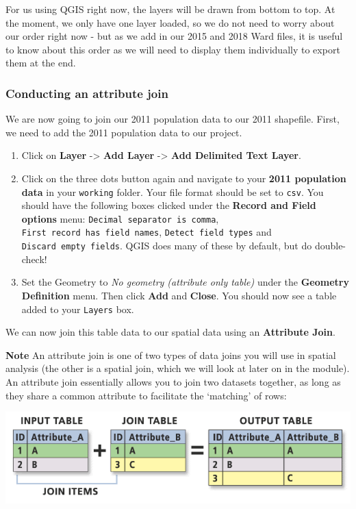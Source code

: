 \documentclass[
]{book}
\begin{document}
For us using QGIS right now, the layers will be drawn from bottom to top. At the moment, we only have one layer loaded, so we do not need to worry about our order right now - but as we add in our 2015 and 2018 Ward files, it is useful to know about this order as we will need to display them individually to export them at the end.

\hypertarget{conducting-an-attribute-join}{%
\subsubsection{Conducting an attribute join}\label{conducting-an-attribute-join}}

We are now going to join our 2011 population data to our 2011 shapefile. First, we need to add the 2011 population data to our project.

\begin{enumerate}
\def\labelenumi{\arabic{enumi}.}
\item
  Click on \textbf{Layer} -\textgreater{} \textbf{Add Layer} -\textgreater{} \textbf{Add Delimited Text Layer}.
\item
  Click on the three dots button again and navigate to your \textbf{2011 population data} in your \texttt{working} folder. Your file format should be set to \texttt{csv}. You should have the following boxes clicked under the \textbf{Record and Field options} menu: \texttt{Decimal\ separator\ is\ comma}, \texttt{First\ record\ has\ field\ names}, \texttt{Detect\ field\ types} and \texttt{Discard\ empty\ fields}. QGIS does many of these by default, but do double-check!
\item
  Set the Geometry to \emph{No geometry (attribute only table)} under the \textbf{Geometry Definition} menu. Then click \textbf{Add} and \textbf{Close}. You should now see a table added to your \texttt{Layers} box.
\end{enumerate}

We can now join this table data to our spatial data using an \textbf{Attribute Join}.

\textbf{Note}
An attribute join is one of two types of data joins you will use in spatial analysis (the other is a spatial join, which we will look at later on in the module). An attribute join essentially allows you to join two datasets together, as long as they share a common attribute to facilitate the `matching' of rows:

\begin{center}\includegraphics[width=12.08in]{images/w02/attribute_joins} \end{center}
\end{document}
